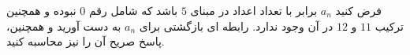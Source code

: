 \exercise
فرض کنید 
$a_n$
 برابر با تعداد اعداد در مبنای 
$5$
  باشد که شامل رقم 
$0$
   نبوده و همچنین ترکیب 
$11$
    و 
$12$
    در آن وجود ندارد. رابطه ای بازگشتی برای 
$a_n$
     به دست آورید و همچنین، پاسخ صریح آن را نیز محاسبه کنید.